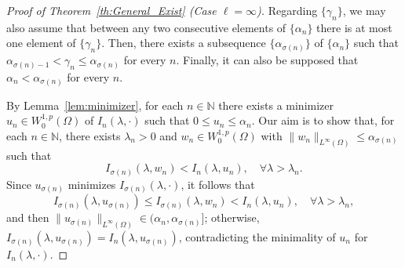 \documentclass[10pt,twoside,english,reqno,a4paper]{amsart}
\theoremstyle{plain}
\theoremstyle{plain}
\theoremstyle{definition}
\theoremstyle{remark}
\numberwithin{equation}{section}
\newcommand{\N}{\mathbb{N}}
\def\sob{W^{1,p}_{0}(\Omega)}
\def\lio{{L^{\infty}(\Omega)}}
\begin{document}
\begin{proof}[Proof of Theorem~\ref{th:General_Exist} (Case $\ell=\infty$)]
Regarding $\{\gamma_n\}$, we may also assume that between any two consecutive elements of $\{\alpha_n\}$ there is at most one element of $\{\gamma_n\}$. Then, there exists a subsequence $\{\alpha_{\sigma(n)}\}$ of $\{\alpha_n\}$ such that $\alpha_{\sigma(n)-1} < \gamma_n \leq \alpha_{\sigma(n)}$ for every $n$. Finally, it can also be supposed that $\alpha_n < \alpha_{\sigma(n)}$ for every $n$.

By Lemma~\ref{lem:minimizer}, for each $n\in\N$ there exists a minimizer $u_n \in \sob$ of $I_n(\lambda, \cdot)$ such that $0\leq u_n \leq\alpha_{n}$. Our aim is to show that, for each $n\in\N$, there exists $\lambda_n>0$ and $w_n\in \sob$ with $\|w_n\|_\lio\leq \alpha_{\sigma(n)}$ such that
\begin{equation}
\label{eq:Pf_large_4}
I_{\sigma(n)}(\lambda, w_n) < I_n(\lambda,u_n),\quad \forall \lambda>\lambda_n.
\end{equation}
Since $u_{\sigma(n)}$ minimizes $I_{\sigma(n)}(\lambda, \cdot)$, it follows that
\[
I_{\sigma(n)}(\lambda,u_{\sigma(n)}) \leq I_{\sigma(n)}(\lambda,w_n) < I_n(\lambda, u_n ),\quad \forall \lambda>\lambda_n,
\]
and then $\|u_{\sigma(n)} \|_{\lio} \in (\alpha_n, \alpha_{\sigma(n)}]$; otherwise, $I_{\sigma(n)} (\lambda, u_{\sigma(n)}) = I_n ( \lambda, u_{\sigma(n)} )$, contradicting the minimality of $u_n$ for $I_{n}(\lambda, \cdot)$.


\end{proof}
\end{document}
